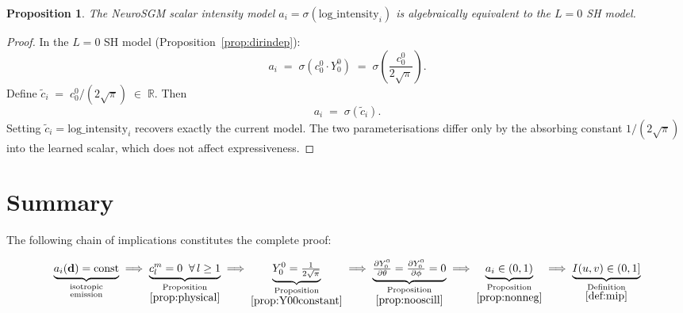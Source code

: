 \documentclass[12pt, a4paper]{article}
\theoremstyle{definition}
\theoremstyle{plain}
\newtheorem{proposition}{Proposition}[section]
\theoremstyle{remark}
\newcommand{\R}{\mathbb{R}}
\begin{document}
\begin{proposition}
\label{prop:equiv}
The NeuroSGM scalar intensity model
$a_i = \sigma(\mathrm{log\_intensity}_i)$
is algebraically equivalent to the $L=0$ SH model.
\end{proposition}

\begin{proof}
In the $L=0$ SH model (Proposition~\ref{prop:dirindep}):
\[
  a_i
  \;=\;
  \sigma\!\left(c_0^0\cdot Y_0^0\right)
  \;=\;
  \sigma\!\left(\frac{c_0^0}{2\sqrt{\pi}}\right).
\]
Define $\tilde{c}_i \;=\; c_0^0/(2\sqrt{\pi}) \;\in\;\R$.  Then
\[
  a_i \;=\; \sigma(\tilde{c}_i).
\]
Setting $\tilde{c}_i = \mathrm{log\_intensity}_i$ recovers exactly
the current model.  The two parameterisations differ only by the
absorbing constant $1/(2\sqrt{\pi})$ into the learned scalar, which
does not affect expressiveness.
\end{proof}

\section{Summary}

The following chain of implications constitutes the complete proof:

\[
\underbrace{a_i(\mathbf{d})=\mathrm{const}}_{\substack{\text{isotropic}\\\text{emission}}}
\;\Longrightarrow\;
\underbrace{c_l^m=0\;\;\forall\,l\geq 1}_{\substack{\text{Proposition}\\\ref{prop:physical}}}
\;\Longrightarrow\;
\underbrace{Y_0^0=\tfrac{1}{2\sqrt{\pi}}}_{\substack{\text{Proposition}\\\ref{prop:Y00constant}}}
\;\Longrightarrow\;
\underbrace{\tfrac{\partial Y_0^0}{\partial\theta}=\tfrac{\partial Y_0^0}{\partial\phi}=0}_{\substack{\text{Proposition}\\\ref{prop:nooscill}}}
\;\Longrightarrow\;
\underbrace{a_i\in(0,1)}_{\substack{\text{Proposition}\\\ref{prop:nonneg}}}
\;\Longrightarrow\;
\underbrace{I(u,v)\in(0,1]}_{\substack{\text{Definition}\\\ref{def:mip}}}
\]

\bigskip
\end{document}
